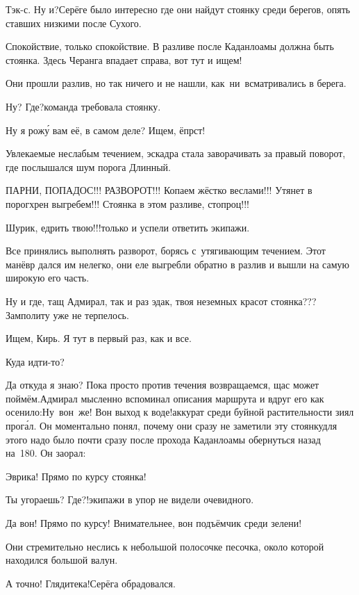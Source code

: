 \diagdash Тэк-с. Ну и?\mdash Серёге было интересно где они найдут стоянку среди берегов, опять ставших низкими после Сухого.

\diagdash Спокойствие, только спокойствие. В разливе после Каданлоамы должна быть стоянка. Здесь Черанга впадает справа, вот тут и ищем!

Они прошли разлив, но так ничего и не нашли, как~ни~всматривались в берега.

\diagdash Ну? Где?\mdash команда требовала стоянку.

\diagdash Ну я рож\'{у} вам её, в самом деле? Ищем, ёпрст! 

Увлекаемые неслабым течением, эскадра стала заворачивать за правый поворот, где послышался шум порога Длинный.

\diagdash ПАРНИ, ПОПАДОС!!! РАЗВОРОТ!!! Копаем жёстко веслами!!! Утянет в порог\mdash хрен выгребем!!! Стоянка в этом разливе, стопроц!!!

\diagdash Шурик, едрить твою!!!\mdash только и успели ответить экипажи. 

Все принялись выполнять разворот, борясь с~утягивающим течением. Этот манёвр дался им нелегко, они еле выгребли обратно в разлив и вышли на самую широкую его часть.

\diagdash Ну и где, тащ Адмирал, так и раз эдак, твоя неземных красот стоянка???\mdash Замполиту уже не терпелось.

\diagdash Ищем, Кирь. Я тут в первый раз, как и все.

\diagdash Куда идти-то?

\diagdash Да откуда я знаю? Пока просто против течения возвращаемся, щас может поймём.\mdash Адмирал мысленно вспоминал описания маршрута и вдруг его как осенило:\mdash Ну~вон~же! Вон выход к воде!\mdash аккурат среди буйной растительности зиял прог\'{а}л. Он моментально понял, почему они сразу не заметили эту стоянку\mdash для этого надо было почти сразу после прохода Каданлоамы обернуться назад на~180\degree. Он заорал:

\diagdash Эврика! Прямо по курсу стоянка!

\diagdash Ты угораешь? Где?!\mdash экипажи в упор не видели очевидного.

\diagdash Да вон! Прямо по курсу! Внимательнее, вон подъёмчик среди зелени!

Они стремительно неслись к небольшой полосочке песочка, около которой находился большой валун.

\diagdash А точно! Глядите\sdash ка!\mdash Серёга обрадовался.

